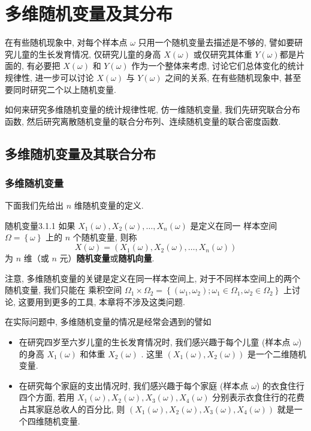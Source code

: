 
\chapter{多维随机变量及其分布}\label{cha:3}
在有些随机现象中, 对每个样本点 $\omega$ 只用一个随机变量去描述是不够的,
譬如要研究儿童的生长发育情况, 仅研究儿童的身高 $X(\omega)$ 或仅研究其体重 $Y(\omega)$都是片面的,
有必要把 $X(\omega)$ 和 $Y(\omega)$ 作为一个整体来考虑, 讨论它们总体变化的统计规律性,
进一步可以讨论 $X(\omega)$ 与 $Y(\omega)$ 之间的关系, 在有些随机现象中, 甚至要同时研究二个以上随机变量.

如何来研究多维随机变量的统计规律性呢, 仿一维随机变量, 我们先研究联合分布函数,
然后研究离散随机变量的联合分布列、连续随机变量的联合密度函数.

\section{多维随机变量及其联合分布}\label{sec:3.1}

\subsection{多维随机变量}\label{ssec:3.1.1}
下面我们先给出 $n$ 维随机变量的定义.
\begin{definition}{随机变量}{3.1.1}
	如果 $X_1(\omega),X_2(\omega),\ldots,X_n(\omega)$ 是定义在同一
	样本空间 $\Omega=\left\{\omega\right\}$ 上的 $n$ 个随机变量, 则称
	\[
	X(\omega)=(X_1(\omega),X_2(\omega),\ldots,X_n(\omega))
	\]
	为 $n$ 维（或 $n$ 元）\textbf{随机变量}或\textbf{随机向量}.
\end{definition}
注意, 多维随机变量的关键是定义在同一样本空间上, 对于不同样本空间上的两个随机变量, 我们只能在
乘积空间 $\Omega_1\times \Omega_2=\left\{(\omega_1,\omega_2);\omega_1 \in \Omega_1,\omega_2 \in \Omega_2 \right\}$ 上讨论,
 这要用到更多的工具, 本章将不涉及这类问题.

 在实际问题中, 多维随机变量的情况是经常会遇到的譬如
  \begin{itemize}
  	\item 在研究四岁至六岁儿童的生长发育情况时, 我们感兴趣于每个儿童 (样本点 $\omega$) 的身高 $X_1(\omega)$
  	和体重 $X_2(\omega)$ . 这里 $(X_1(\omega),X_2(\omega))$ 是一个二维随机变量.
  	\item 在研究每个家庭的支出情况时, 我们感兴趣于每个家庭 (样本点 $\omega$) 的衣食住行四个方面,
  	若用 $X_1(\omega),X_2(\omega),X_3(\omega),X_4(\omega)$ 分别表示衣食住行的花费占其家庭总收人的百分比,
  	则 $(X_1(\omega),X_2(\omega),X_3(\omega),X_4(\omega))$ 就是一个四维随机变量.
  \end{itemize}

